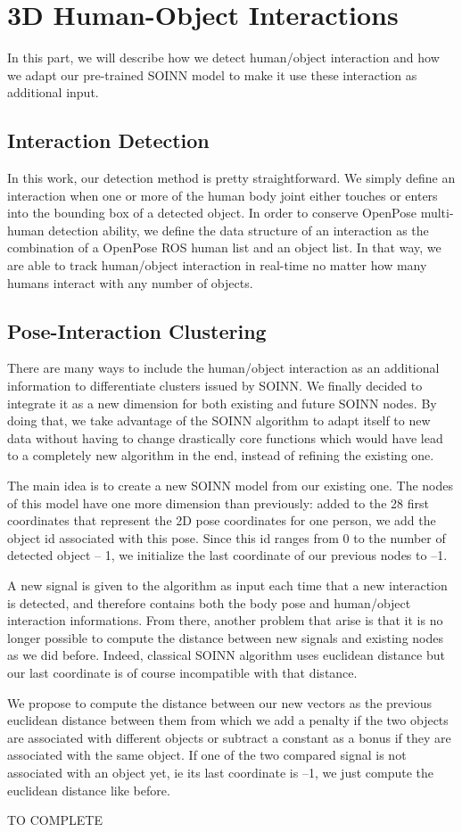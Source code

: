 \section{3D Human-Object Interactions}
In this part, we will describe how we detect human/object interaction and how we adapt our pre-trained SOINN model to make it use these interaction as additional input.

\subsection{Interaction Detection}
In this work, our detection method is pretty straightforward. We simply define an interaction when one or more of the human body joint either touches or enters into the bounding box of a detected object. In order to conserve OpenPose multi-human detection ability, we define the data structure of an interaction as the combination of a OpenPose ROS human list and an object list. In that way, we are able to track human/object interaction in real-time no matter how many humans interact with any number of objects.

\subsection{Pose-Interaction Clustering}
\label{section:pose-interaction_clustering}
There are many ways to include the human/object interaction as an additional information to differentiate clusters issued by SOINN. We finally decided to integrate it as a new dimension for both existing and future SOINN nodes. By doing that, we take advantage of the SOINN algorithm to adapt itself to new data without having to change drastically core functions which would have lead to a completely new algorithm in the end, instead of refining the existing one.

The main idea is to create a new SOINN model from our existing one. The nodes of this model have one more dimension than previously: added to the 28 first coordinates that represent the 2D pose coordinates for one person, we add the object id associated with this pose. Since this id ranges from 0 to the number of detected object -- 1, we initialize the last coordinate of our previous nodes to --1. 

A new signal is given to the algorithm as input each time that a new interaction is detected, and therefore contains both the body pose and human/object interaction informations. From there, another problem that arise is that it is no longer possible to compute the distance between new signals and existing nodes as we did before. Indeed, classical SOINN algorithm uses euclidean distance but our last coordinate is of course incompatible with that distance. 

We propose to compute the distance between our new vectors as the previous euclidean distance between them from which we add a penalty if the two objects are associated with different objects or subtract a constant as a bonus if they are associated with the same object. If one of the two compared signal is not associated with an object yet, ie its last coordinate is --1, we just compute the euclidean distance like before.


TO COMPLETE
